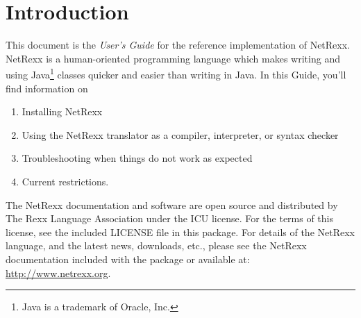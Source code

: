 \chapter{Introduction}
This document is the \emph{User’s Guide} for the reference implementation of
NetRexx. NetRexx is a human-oriented programming language which makes
writing and using Java\footnote{Java is a trademark of Oracle, Inc.} classes quicker and easier than writing in Java. 
In this Guide, you’ll find information on
\begin{enumerate} 
\item Installing NetRexx 
\item Using the NetRexx translator as a compiler, interpreter, or
  syntax checker 
\item Troubleshooting when things do not work as expected
\item Current restrictions.
\end{enumerate} 
The NetRexx documentation and software are open source and distributed by The Rexx Language Association under the \textsc{ICU} license. For the terms of this license, see the included \textsc{LICENSE} file in this package.
For details of the NetRexx language, and the latest news, downloads, etc., please see the NetRexx documentation included with the package or available at: \url{http://www.netrexx.org}.
